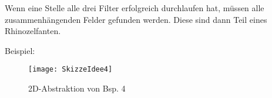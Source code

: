 Wenn eine Stelle alle drei Filter erfolgreich durchlaufen hat, müssen alle zusammenhängenden Felder gefunden werden. Diese sind dann Teil eines Rhinozelfanten.

\clearpage
Beispiel: \vspace{3em}
\begin{figure}[ht]
	\centering
	\texttt{[image: SkizzeIdee4]}
	\caption {2D-Abstraktion von Bsp. 4}
\end{figure}